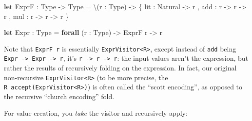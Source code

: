 \documentclass[]{article}
\newenvironment{Shaded}{}{}
\newcommand{\CommentTok}[1]{\textcolor[rgb]{0.38,0.63,0.69}{\textit{#1}}}
\newcommand{\KeywordTok}[1]{\textcolor[rgb]{0.00,0.44,0.13}{\textbf{#1}}}
\newcommand{\NormalTok}[1]{#1}
\newcommand{\OperatorTok}[1]{\textcolor[rgb]{0.40,0.40,0.40}{#1}}
\begin{document}
\begin{Shaded}
\begin{Highlighting}[]
\KeywordTok{let}\CommentTok{ }\NormalTok{ExprF}\CommentTok{ }\NormalTok{:}\CommentTok{ }\NormalTok{Type}\CommentTok{ }\OperatorTok{{-}\textgreater{}}\CommentTok{ }\NormalTok{Type}
\CommentTok{      }\NormalTok{=}\CommentTok{ }\OperatorTok{\textbackslash{}}\NormalTok{(r}\CommentTok{ }\NormalTok{:}\CommentTok{ }\NormalTok{Type)}\CommentTok{ }\OperatorTok{{-}\textgreater{}}
\CommentTok{        }\NormalTok{\{}\CommentTok{ }\NormalTok{lit}\CommentTok{ }\NormalTok{:}\CommentTok{ }\NormalTok{Natural}\CommentTok{ }\OperatorTok{{-}\textgreater{}}\CommentTok{ }\NormalTok{r}
\CommentTok{        }\NormalTok{,}\CommentTok{ }\NormalTok{add}\CommentTok{    }\NormalTok{:}\CommentTok{ }\NormalTok{r}\CommentTok{ }\OperatorTok{{-}\textgreater{}}\CommentTok{ }\NormalTok{r}\CommentTok{ }\OperatorTok{{-}\textgreater{}}\CommentTok{ }\NormalTok{r}
\CommentTok{        }\NormalTok{,}\CommentTok{ }\NormalTok{mul}\CommentTok{    }\NormalTok{:}\CommentTok{ }\NormalTok{r}\CommentTok{ }\OperatorTok{{-}\textgreater{}}\CommentTok{ }\NormalTok{r}\CommentTok{ }\OperatorTok{{-}\textgreater{}}\CommentTok{ }\NormalTok{r}
\CommentTok{        }\NormalTok{\}}

\KeywordTok{let}\CommentTok{ }\NormalTok{Expr}\CommentTok{ }\NormalTok{:}\CommentTok{ }\NormalTok{Type}
\CommentTok{      }\NormalTok{=}\CommentTok{ }\KeywordTok{forall}\CommentTok{ }\NormalTok{(r}\CommentTok{ }\NormalTok{:}\CommentTok{ }\NormalTok{Type)}\CommentTok{ }\OperatorTok{{-}\textgreater{}}\CommentTok{ }\NormalTok{ExprF}\CommentTok{ }\NormalTok{r}\CommentTok{ }\OperatorTok{{-}\textgreater{}}\CommentTok{ }\NormalTok{r}
\end{Highlighting}
\end{Shaded}

Note that \texttt{ExprF\ r} is essentially
\texttt{ExprVisitor\textless{}R\textgreater{}}, except instead of \texttt{add}
being \texttt{Expr\ -\textgreater{}\ Expr\ -\textgreater{}\ r}, it's
\texttt{r\ -\textgreater{}\ r\ -\textgreater{}\ r}: the input values aren't the
expression, but rather the results of recursively folding on the expression. In
fact, our original non-recursive \texttt{ExprVisitor\textless{}R\textgreater{}}
(to be more precise, the
\texttt{R\ accept(ExprVisitor\textless{}R\textgreater{})}) is often called the
``scott encoding'', as opposed to the recursive ``church encoding'' fold.

For value creation, you \emph{take} the visitor and recursively apply:
\end{document}
